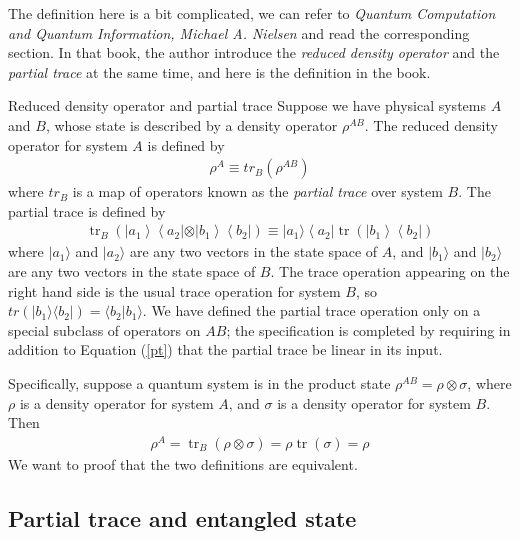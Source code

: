 \documentclass[UTF8,12pt]{article} %
\begin{document}
The definition here is a bit complicated, we can refer to \textit{Quantum Computation and Quantum Information, Michael A. Nielsen} and read the corresponding section. In that book, the author introduce the \textit{reduced density operator} and the \textit{partial trace} at the same time, and here is the definition in the book.\\

\begin{definition}{Reduced density operator and partial trace}{}
Suppose we have physical systems $A$ and $B$, whose state is described by a density operator $\rho^{AB}$. The reduced density operator for system $A$ is defined by
\begin{align}
\rho^{A} \equiv tr_{B}(\rho^{AB})
\end{align}
where $tr_{B}$ is a map of operators known as the \textit{partial trace} over system $B$. The partial trace is defined by
\begin{align}\label{pt}
\operatorname{tr}_{B}\left( | a_{1}\right\rangle\left\langle a_{2}|\otimes| b_{1}\right\rangle\left\langle b_{2} |\right) \equiv | a_{1} \rangle\left\langle a_{2} | \operatorname{tr}\left( | b_{1}\right\rangle\left\langle b_{2} |\right)\right.
\end{align}
where $|a_{1}\rangle$ and $|a_{2}\rangle$ are any two vectors in the state space of $A$, and $|b_{1}\rangle$ and $|b_{2}\rangle$ are any two vectors in the state space of $B$. The trace operation appearing on the right hand side is the usual trace operation for system $B$, so $tr(|b_{1}\rangle\langle b_{2}|) = \langle b_{2}|b_{1}\rangle$. We have defined the partial trace operation only on a special subclass of operators on $AB$; the specification is completed by requiring in addition to Equation (\ref{pt}) that the partial trace be linear in its input.
\end{definition}

Specifically, suppose a quantum system is in the product state $\rho^{AB} = \rho \otimes \sigma$, where $\rho$ is a density operator for system $A$, and $\sigma$ is a density operator for system $B$. Then
\begin{align}
\rho^{A}=\operatorname{tr}_{B}(\rho \otimes \sigma)=\rho \operatorname{tr}(\sigma)=\rho
\end{align}
We want to proof that the two definitions are equivalent. 

\subsection{Partial trace and entangled state}
\end{document}
